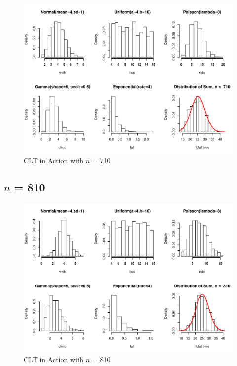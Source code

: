 \documentclass[11pt,letter]{article}\usepackage[]{graphicx}\usepackage[]{color}
\makeatletter
\def\maxwidth{ %
  \ifdim\Gin@nat@width>\linewidth
    \linewidth
  \else
    \Gin@nat@width
  \fi
}
\newenvironment{knitrout}{}{} %
\makeatother
\begin{document}
\begin{knitrout}
\color{fgcolor}\begin{figure}[h]

{\centering \includegraphics[width=\maxwidth]{figure/n-710-1} 

}

\caption[CLT in Action with ]{CLT in Action with $n$ = 710}\label{fig:n-710}
\end{figure}


\end{knitrout}
\newpage
\subsection{$n$ = 810}

\begin{knitrout}
\color{fgcolor}\begin{figure}[h]

{\centering \includegraphics[width=\maxwidth]{figure/n-810-1} 

}

\caption[CLT in Action with ]{CLT in Action with $n$ = 810}\label{fig:n-810}
\end{figure}


\end{knitrout}
\newpage
\end{document}
